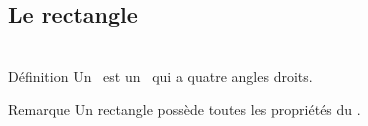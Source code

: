 \documentclass{beamer}
\begin{document}
\subsection{Le rectangle}

\begin{frame}
	\frametitle{}  
	\framesubtitle{}

\begin{columns}[onlytextwidth]	
	\begin{column}{0.7\textwidth}
		\begin{exampleblock}{Définition}
			Un \rect\ est un \myquad\ qui a quatre angles droits.
		\end{exampleblock}
		
		\begin{block}{Remarque}
			Un rectangle possède toutes les propriétés du \para .
		\end{block}
		
	\end{column}
	\begin{column}{0.3\textwidth}
	\end{column}	
\end{columns}
\end{frame}
\end{document}
